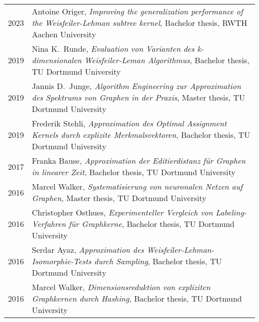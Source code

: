 \documentclass[11pt, a4paper, DIV=14, headings=small]{scrartcl}
\begin{document}
\begin{longtabu}{p{2.1cm}p{12.0cm}}
		2023 & Antoine Origer, \emph{Improving the generalization performance of the Weisfeiler-Lehman subtree kernel}, Bachelor thesis, RWTH Aachen University                                                     \\
		2019 & Nina K.\ Runde, \emph{Evaluation von Varianten des k-dimensionalen Weisfeiler-Leman Algorithmus}, Bachelor thesis, TU Dortmund University                                                            \\
		2019 & Jannis D.\ Junge, \emph{Algorithm Engineering zur Approximation des Spektrums von Graphen in der Praxis}, Master thesis, TU Dortmund University                                                      \\
		2019 & Frederik Stehli, \emph{Approximation des Optimal Assignment Kernels durch explizite Merkmalsvektoren}, Bachelor thesis, TU Dortmund University                                                       \\
		2017 & Franka Bause, \emph{Approximation der Editierdistanz für Graphen in linearer Zeit}, Bachelor thesis, TU Dortmund University                                                                          \\
		2016 & Marcel Walker, \emph{Systematisierung von neuronalen Netzen auf Graphen}, Master thesis, TU Dortmund University                                                                                      \\
		2016 & Christopher Osthues, \emph{Experimenteller Vergleich von Labeling-Verfahren für Graphkerne}, Bachelor thesis, TU Dortmund University                                                                 \\
		2016 & Serdar Ayaz, \emph{Approximation des Weisfeiler-Lehman-Isomorphie-Tests durch Sampling}, Bachelor thesis, TU Dortmund University                                                                     \\
		2016 & Marcel Walker, \emph{Dimensionsreduktion von expliziten Graphkernen durch Hashing}, Bachelor thesis, TU Dortmund University                                                                          \\
	\end{longtabu}
	
\end{document}

